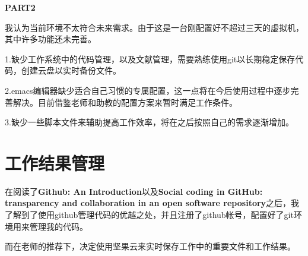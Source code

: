 \documentclass{ctexart}
\begin{document}
\begin{sloppypar}
\textbf{PART2}

我认为当前环境不太符合未来需求。由于这是一台刚配置好不超过三天的虚拟机，其中许多功能还未完善。

1.缺少工作系统中的代码管理，以及文献管理，需要熟练使用git以长期稳定保存代码，创建云盘以实时备份文件。

2.emacs编辑器缺少适合自己习惯的专属配置，这一点将在今后使用过程中逐步完善解决。目前借鉴老师和助教的配置方案来暂时满足工作条件。

3.缺少一些脚本文件来辅助提高工作效率，将在之后按照自己的需求逐渐增加。

\section*{工作结果管理}

在阅读了\textbf{Github: An Introduction}\cite{2016Github}以及\textbf{Social coding in GitHub: transparency and collaboration in an open software repository}\cite{2012Social}之后，我了解到了使用github管理代码的优越之处，并且注册了github帐号，配置好了git环境用来管理我的代码。

而在老师的推荐下，决定使用坚果云来实时保存工作中的重要文件和工作结果。







\end{sloppypar}
\end{document}
